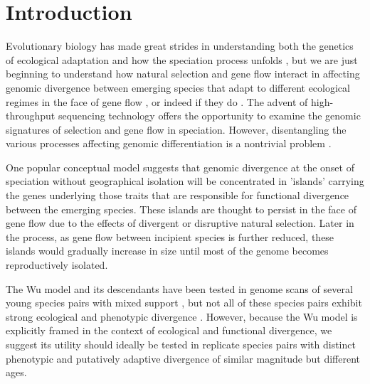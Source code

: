 \section{Introduction}

Evolutionary biology has made great strides in understanding both the genetics of ecological adaptation \cite{hoekstra2006single, schluter2009genetics, arnegard2014genetics} and how the speciation process unfolds \cite{coyne2004speciatjon, gavrilets2004fitness, noor2006speciation, seehausen2014genomics}, but we are just beginning to understand how natural selection and gene flow interact in affecting genomic divergence between emerging species that adapt to different ecological regimes in the face of gene flow \cite{feder2012genomics}, or indeed if they do \cite{bierne2013pervasive}. The advent of high-throughput sequencing technology offers the opportunity to examine the genomic signatures of selection and gene flow in speciation. However, disentangling the various processes affecting genomic differentiation is a nontrivial problem \cite{charlesworth1998measures, noor2009islands, cruickshank2014reanalysis}.

One popular conceptual model \cite{wu2001genic} suggests that genomic divergence at the onset of speciation without geographical isolation will be concentrated in 'islands' carrying the genes underlying those traits that are responsible for functional divergence between the emerging species. These islands are thought to persist in the face of gene flow due to the effects of divergent or disruptive natural selection. Later in the process, as gene flow between incipient species is further reduced, these islands would gradually increase in size until most of the genome becomes reproductively isolated.

The Wu \cite{wu2001genic} model and its descendants \cite{wu2004genes, via2008genetic, feder2012genomics} have been tested in genome scans of several young species pairs with mixed support \cite{turner2005genomic, ellegren2012genomic, gagnaire2013genetic, martin2013genomewide, renaut2013genomic, ruegg2014role}, but not all of these species pairs exhibit strong ecological and phenotypic divergence \cite{harr2006genomic, carneiro2010speciation}. However, because the Wu model is explicitly framed in the context of ecological and functional divergence, we suggest its utility should ideally be tested in replicate species pairs with distinct phenotypic and putatively adaptive divergence of similar magnitude but different ages.

